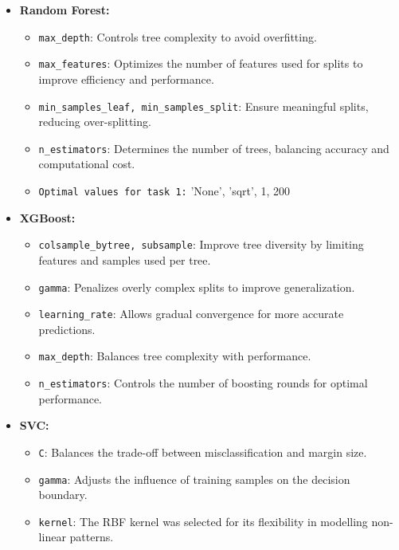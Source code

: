 \documentclass{article}
\begin{document}
\begin{itemize}
    \item \textbf{Random Forest:}
    \begin{itemize}
        \item \texttt{max\_depth}: Controls tree complexity to avoid overfitting.
        \item \texttt{max\_features}: Optimizes the number of features used for splits to improve efficiency and performance.
        \item \texttt{min\_samples\_leaf, min\_samples\_split}: Ensure meaningful splits, reducing over-splitting.
        \item \texttt{n\_estimators}: Determines the number of trees, balancing accuracy and computational cost.
        \item \texttt{Optimal values for task 1:} 'None', 'sqrt', 1, 200
    \end{itemize}

    \item \textbf{XGBoost:}
    \begin{itemize}
        \item \texttt{colsample\_bytree, subsample}: Improve tree diversity by limiting features and samples used per tree.
        \item \texttt{gamma}: Penalizes overly complex splits to improve generalization.
        \item \texttt{learning\_rate}: Allows gradual convergence for more accurate predictions.
        \item \texttt{max\_depth}: Balances tree complexity with performance.
        \item \texttt{n\_estimators}: Controls the number of boosting rounds for optimal performance.
    \end{itemize}

    \item \textbf{SVC:}
    \begin{itemize}
        \item \texttt{C}: Balances the trade-off between misclassification and margin size.
        \item \texttt{gamma}: Adjusts the influence of training samples on the decision boundary.
        \item \texttt{kernel}: The RBF kernel was selected for its flexibility in modelling non-linear patterns.
    \end{itemize}


\end{itemize}
\end{document}
